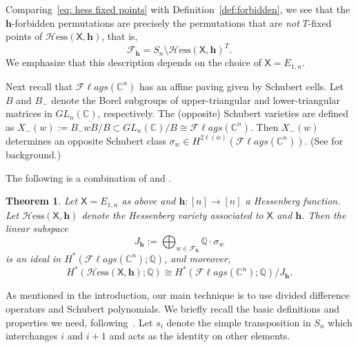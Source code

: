 \documentclass[11pt]{amsart}
\theoremstyle{plain}
\newtheorem{thm}{Theorem}[section]
\theoremstyle{definition}
\newcommand{\Hess}{\mathcal{H}\mathrm{ess}}
\newcommand{\mx}{\mathsf{X}}
\newcommand{\hess}{{\mathbf h}}
\newcommand{\Fl}{\mathcal{F}\ell ags}
\newcommand{\C}{\mathbb{C}}           %
\newcommand{\Q}{\mathbb{ Q}}           %
\numberwithin{equation}{section}
\begin{document}
Comparing~\eqref{eq: hess fixed points} with Definition~\ref{def:forbidden}, we see that the $\hess$-forbidden permutations are precisely the permutations that are \emph{not} $T$-fixed points of $\Hess(\mx,\hess)$, that is,
\[
\mathcal{F}_\hess = S_n \setminus \Hess(\mx,\hess)^T.
\]
We emphasize that this description depends on the choice of $\mx = E_{1,n}$.



 
 



Next recall that $\Fl(\C^n)$ has an affine paving given by Schubert cells. Let $B$ and $B_-$ denote the Borel subgroups of upper-triangular and lower-triangular matrices in $GL_n(\C)$, respectively. The (opposite) Schubert varieties are defined as $X_-(w) := \overline{B_{-}wB/B} \subset GL_n(\C)/B \cong \Fl(\C^n)$.  Then $X_-(w)$ determines an opposite Schubert class $\sigma_w \in H^{2\ell(w)}(\Fl(\C^n))$. (See \cite[Chapter 1]{Handbook-Hess} for background.) 

The following is a combination of \cite[Corollary 31]{AbeCrooks} and \cite[Theorem 32]{AbeCrooks}. 

\begin{thm}\label{theorem: main AbeCrooks}
Let $\mx = E_{1,n}$ as above and $\hess:[n] \to [n]$ a Hessenberg function. Let $\Hess(\mx,\hess)$ denote the Hessenberg variety associated to $\mx$ and $\hess$. Then 
the linear subspace 
\begin{equation*}
J_\hess := \bigoplus_{w \in \mathcal{F}_\hess} \Q \cdot \sigma_w
\end{equation*} 
is an ideal in $H^*(\Fl(\C^n);\Q)$, and moreover,
\begin{equation*}
H^*(\Hess(\mx, \hess); \Q) \cong H^*(\Fl(\C^n);\Q)/J_\hess.
\end{equation*}
\end{thm}




 











 
As mentioned in the introduction, our main technique is to use divided difference operators and Schubert polynomials. We briefly recall the basic definitions and properties we need, following~\cite[Chapters~II and~IV]{Macdonald1991}.  Let $s_i$ denote the simple transposition in $S_n$ which interchanges $i$ and $i+1$ and acts as the identity on other elements.  
\end{document}
